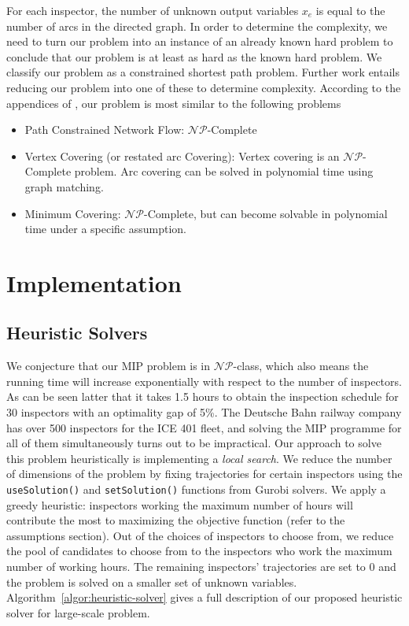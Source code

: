 \documentclass[11pt]{article}
\begin{document}
For each inspector, the number of unknown output variables $x_e$ is equal to the number of arcs in the directed graph. In order to determine the complexity, we need to turn our problem into an instance of an already known hard problem to conclude that our problem is at least as hard as the known hard problem. We classify our problem as a constrained shortest path problem. Further work entails reducing our problem into one of these to determine complexity. According to the appendices of \cite{Garey:1990:CIG:574848}, our problem is most similar to the following problems
\begin{itemize}
    \item Path Constrained Network Flow: $\mathcal{NP}$-Complete
    \item Vertex Covering (or restated arc Covering): 
    Vertex covering is an $\mathcal{NP}$-Complete problem.  
    Arc covering can be solved in polynomial time using graph matching.
    \item Minimum Covering: $\mathcal{NP}$-Complete, but can become solvable in polynomial time under a specific assumption. 
\end{itemize}

\section{Implementation}

\subsection{Heuristic Solvers}
We conjecture that our MIP problem is in 
$\mathcal{NP}$-class, which also means the running time will increase exponentially with 
respect to the number of inspectors. As can be seen latter that it takes 1.5 hours to
obtain the inspection schedule for 30 inspectors with an optimality gap of 5\%. The
Deutsche Bahn railway company has over 500 inspectors for the ICE 401 fleet, and solving the MIP programme for all of them simultaneously turns out to be impractical. 
Our approach to solve this problem heuristically is implementing a \textit{local search}. We reduce the number of dimensions of the problem by fixing trajectories for certain inspectors using the \texttt{useSolution()} and \texttt{setSolution()} functions from Gurobi solvers. We apply a greedy heuristic: inspectors working the maximum number of hours will contribute the most to maximizing the objective function (refer to the assumptions section). Out of the choices of inspectors to choose from, we reduce the pool of candidates to choose from to the inspectors who work the maximum number of working hours. The remaining inspectors' trajectories are set to $0$ and the problem is solved on a smaller set of unknown variables. Algorithm~\ref{algor:heuristic-solver} gives a full
description of our proposed heuristic solver for large-scale problem.
\end{document}
